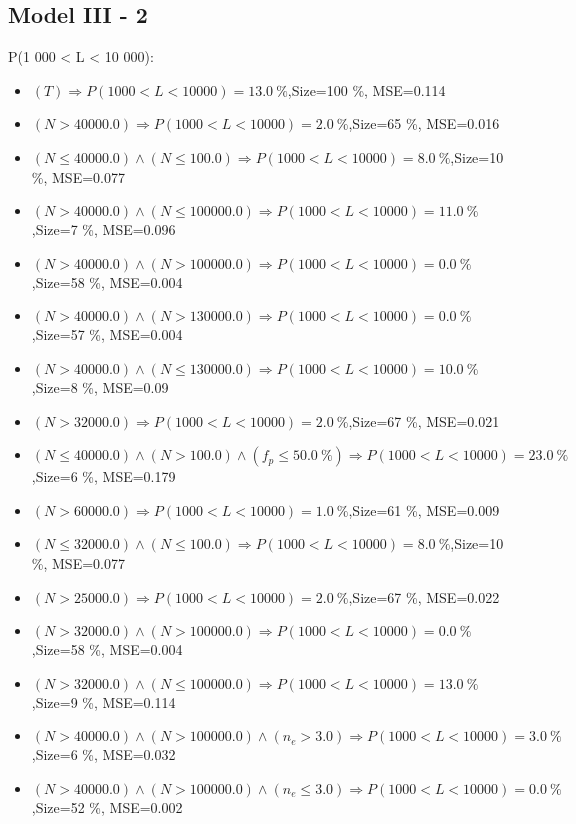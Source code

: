 \documentclass[numbered]{CSL}
\begin{document}
\subsection{Model III - 2}
P(1 000 < L < 10 000):
\begin{itemize}
\item $(T) \Rightarrow P(1 000 < L < 10 000) = 13.0~\%$,\hfill Size=100 \%, MSE=0.114
\item $(N > 40000.0) \Rightarrow P(1 000 < L < 10 000) = 2.0~\%$,\hfill Size=65 \%, MSE=0.016
\item $(N \leq 40000.0) \land (N \leq 100.0) \Rightarrow P(1 000 < L < 10 000) = 8.0~\%$,\hfill Size=10 \%, MSE=0.077
\item $(N > 40000.0) \land (N \leq 100000.0) \Rightarrow P(1 000 < L < 10 000) = 11.0~\%$,\hfill Size=7 \%, MSE=0.096
\item $(N > 40000.0) \land (N > 100000.0) \Rightarrow P(1 000 < L < 10 000) = 0.0~\%$,\hfill Size=58 \%, MSE=0.004
\item $(N > 40000.0) \land (N > 130000.0) \Rightarrow P(1 000 < L < 10 000) = 0.0~\%$,\hfill Size=57 \%, MSE=0.004
\item $(N > 40000.0) \land (N \leq 130000.0) \Rightarrow P(1 000 < L < 10 000) = 10.0~\%$,\hfill Size=8 \%, MSE=0.09
\item $(N > 32000.0) \Rightarrow P(1 000 < L < 10 000) = 2.0~\%$,\hfill Size=67 \%, MSE=0.021
\item $(N \leq 40000.0) \land (N > 100.0) \land (f_p \leq 50.0~\%) \Rightarrow P(1 000 < L < 10 000) = 23.0~\%$,\hfill Size=6 \%, MSE=0.179
\item $(N > 60000.0) \Rightarrow P(1 000 < L < 10 000) = 1.0~\%$,\hfill Size=61 \%, MSE=0.009
\item $(N \leq 32000.0) \land (N \leq 100.0) \Rightarrow P(1 000 < L < 10 000) = 8.0~\%$,\hfill Size=10 \%, MSE=0.077
\item $(N > 25000.0) \Rightarrow P(1 000 < L < 10 000) = 2.0~\%$,\hfill Size=67 \%, MSE=0.022
\item $(N > 32000.0) \land (N > 100000.0) \Rightarrow P(1 000 < L < 10 000) = 0.0~\%$,\hfill Size=58 \%, MSE=0.004
\item $(N > 32000.0) \land (N \leq 100000.0) \Rightarrow P(1 000 < L < 10 000) = 13.0~\%$,\hfill Size=9 \%, MSE=0.114
\item $(N > 40000.0) \land (N > 100000.0) \land (n_e > 3.0) \Rightarrow P(1 000 < L < 10 000) = 3.0~\%$,\hfill Size=6 \%, MSE=0.032
\item $(N > 40000.0) \land (N > 100000.0) \land (n_e \leq 3.0) \Rightarrow P(1 000 < L < 10 000) = 0.0~\%$,\hfill Size=52 \%, MSE=0.002

\end{itemize}
\end{document}
